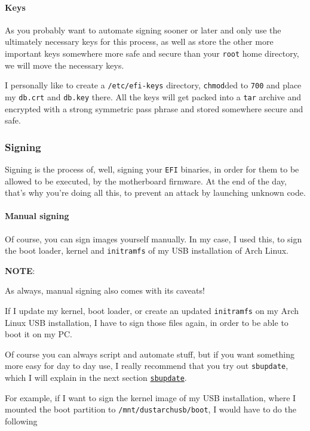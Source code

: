 \documentclass[9pt]{report}
\newcommand{\admonition}[2]{\textbf{#1}: {#2}}
\begin{document}
\vfill\eject

\hypertarget{x-keys}{\paragraph{Keys}}
As you probably want to automate signing sooner or later and only use the ultimately necessary keys for this process, as well as store the other more important keys somewhere more safe and secure than your \texttt{root} home directory, we will move the necessary keys.


I personally like to create a \texttt{/etc/efi-keys} directory, \texttt{chmod}ded to \texttt{700} and place my \texttt{db.crt} and \texttt{db.key} there.
All the keys will get packed into a \texttt{tar} archive and encrypted with a strong symmetric pass phrase and stored somewhere secure and safe.



\vfill\eject

\hypertarget{x-signing}{\subsubsection{Signing}}
Signing is the process of, well, signing your \texttt{EFI} binaries, in order for them to be allowed to be executed, by the motherboard firmware.
At the end of the day, that’s why you’re doing all this, to prevent an attack by launching unknown code.



\vfill\eject

\hypertarget{x-manual-signing}{\paragraph{Manual signing}}
Of course, you can sign images yourself manually.
In my case, I used this, to sign the boot loader, kernel and \texttt{initramfs} of my USB installation of Arch Linux.


\admonition{NOTE}{As always, manual signing also comes with its caveats!


If I update my kernel, boot loader, or create an updated \texttt{initramfs} on my Arch Linux USB installation, I have to sign those files again, in order to be able to boot it on my PC.


Of course you can always script and automate stuff, but if you want something more easy for day to day use, I really recommend that you try out \texttt{sbupdate},  which I will explain in the next section \hyperlink{sbupdate}{\texttt{sbupdate}}.

}
For example, if I want to sign the kernel image of my USB installation, where I mounted the boot partition to \texttt{/mnt/dustarchusb/boot}, I would have to do the following
\end{document}
